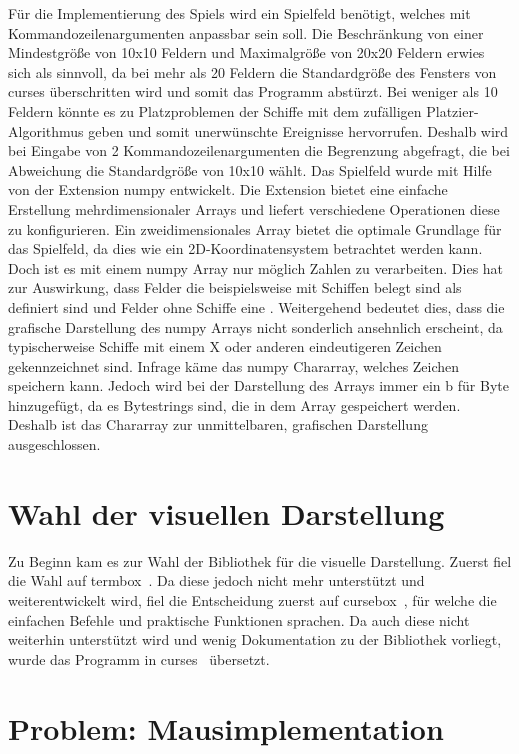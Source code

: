 \documentclass{llncs}
\begin{document}
Für die Implementierung des Spiels wird ein Spielfeld benötigt, welches mit Kommandozeilenargumenten anpassbar sein soll. Die Beschränkung von einer Mindestgröße von 10x10 Feldern und Maximalgröße von 20x20
Feldern erwies sich als sinnvoll, da bei mehr als 20 Feldern die Standardgröße des Fensters von curses überschritten wird und somit das Programm abstürzt. 
Bei weniger als 10 Feldern könnte es zu Platzproblemen der Schiffe mit dem zufälligen Platzier-Algorithmus geben und somit unerwünschte Ereignisse hervorrufen.
Deshalb wird bei Eingabe von 2 Kommandozeilenargumenten die Begrenzung abgefragt, die bei Abweichung die Standardgröße von 10x10 wählt.
Das Spielfeld wurde mit Hilfe von der Extension numpy entwickelt. Die Extension bietet eine einfache Erstellung mehrdimensionaler Arrays und liefert verschiedene Operationen diese zu konfigurieren.
Ein zweidimensionales Array bietet die optimale Grundlage für das Spielfeld, da dies wie ein 2D-Koordinatensystem betrachtet werden kann.
Doch ist es mit einem numpy Array nur möglich Zahlen zu verarbeiten. Dies hat zur Auswirkung, dass Felder die beispielsweise mit Schiffen belegt sind als \grqq{} definiert sind und Felder ohne Schiffe eine \grqq{}.
Weitergehend bedeutet dies, dass die grafische Darstellung des numpy Arrays nicht sonderlich ansehnlich erscheint, da typischerweise Schiffe mit einem \glqq X\grqq{} oder anderen eindeutigeren Zeichen gekennzeichnet sind. 
Infrage käme das numpy Chararray, welches Zeichen speichern kann. Jedoch wird bei der Darstellung des Arrays immer ein \glqq b\grqq{} für Byte hinzugefügt, da es Bytestrings sind, die in dem Array gespeichert werden.
Deshalb ist das Chararray zur unmittelbaren, grafischen Darstellung ausgeschlossen.

\section{Wahl der visuellen Darstellung}

Zu Beginn kam es zur Wahl der Bibliothek für die visuelle Darstellung. Zuerst fiel die Wahl auf termbox~\cite{Termbox}. Da diese jedoch nicht mehr unterstützt und weiterentwickelt wird, fiel die Entscheidung zuerst auf cursebox~\cite{Cursebox}, für welche
die einfachen Befehle und praktische Funktionen sprachen. Da auch diese nicht weiterhin unterstützt wird und wenig Dokumentation zu der Bibliothek vorliegt, wurde das Programm in curses~\cite{Curses} übersetzt.

\section{Problem: Mausimplementation}
\end{document}
